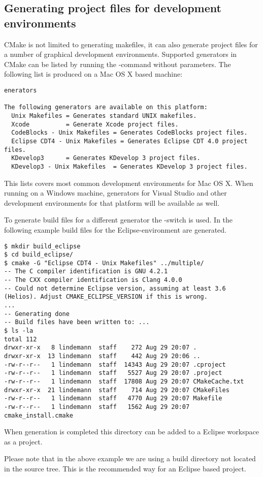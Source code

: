 \subsection{Generating project files for development environments}

CMake is not limited to generating makefiles, it can also generate project files for a number of graphical development environments. Supported generators in CMake can be listed by running the -command without parameters. The following list is produced on a Mac OS X based machine:

\cmdmode

\begin{lstlisting}
enerators

The following generators are available on this platform:
  Unix Makefiles = Generates standard UNIX makefiles.
  Xcode          = Generate Xcode project files.
  CodeBlocks - Unix Makefiles = Generates CodeBlocks project files.
  Eclipse CDT4 - Unix Makefiles = Generates Eclipse CDT 4.0 project files.
  KDevelop3      = Generates KDevelop 3 project files.
  KDevelop3 - Unix Makefiles  = Generates KDevelop 3 project files.
\end{lstlisting}

This lists covers most common development environments for Mac OS X. When running on a Windows machine, generators for Visual Studio and other development environments for that platform will be available as well.

To generate build files for a different generator the -switch is used. In the following example build files for the Eclipse-environment are generated. 

\begin{lstlisting}
$ mkdir build_eclipse
$ cd build_eclipse/
$ cmake -G "Eclipse CDT4 - Unix Makefiles" ../multiple/
-- The C compiler identification is GNU 4.2.1
-- The CXX compiler identification is Clang 4.0.0
-- Could not determine Eclipse version, assuming at least 3.6 (Helios). Adjust CMAKE_ECLIPSE_VERSION if this is wrong.
...
-- Generating done
-- Build files have been written to: ...
$ ls -la
total 112
drwxr-xr-x   8 lindemann  staff    272 Aug 29 20:07 .
drwxr-xr-x  13 lindemann  staff    442 Aug 29 20:06 ..
-rw-r--r--   1 lindemann  staff  14343 Aug 29 20:07 .cproject
-rw-r--r--   1 lindemann  staff   5527 Aug 29 20:07 .project
-rw-r--r--   1 lindemann  staff  17808 Aug 29 20:07 CMakeCache.txt
drwxr-xr-x  21 lindemann  staff    714 Aug 29 20:07 CMakeFiles
-rw-r--r--   1 lindemann  staff   4770 Aug 29 20:07 Makefile
-rw-r--r--   1 lindemann  staff   1562 Aug 29 20:07 cmake_install.cmake
\end{lstlisting}

When generation is completed this directory can be added to a Eclipse workspace as a project.

Please note that in the above example we are using a build directory not located in the source tree. This is the recommended way for an Eclipse based project.


